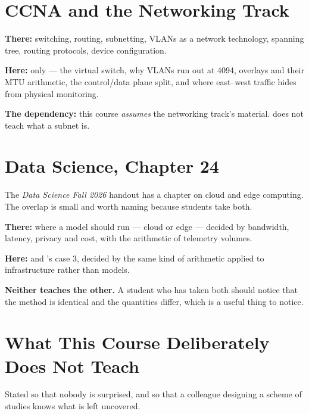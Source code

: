 \section{CCNA and the Networking Track}

\begin{tight}
  \item \textbf{There:} switching, routing, subnetting, VLANs as a network
        technology, spanning tree, routing protocols, device configuration.
  \item \textbf{Here:}  only --- the virtual switch, why VLANs
        run out at 4094, overlays and their MTU arithmetic, the control/data
        plane split, and where east--west traffic hides from physical
        monitoring.
  \item \textbf{The dependency:} this course \emph{assumes} the networking
        track's material.  does not teach what a subnet is.
\end{tight}

\section{Data Science, Chapter 24}

The \emph{Data Science Fall 2026} handout has a chapter on cloud and edge
computing. The overlap is small and worth naming because students take both.

\begin{tight}
  \item \textbf{There:} where a model should run --- cloud or edge --- decided
        by bandwidth, latency, privacy and cost, with the arithmetic of
        telemetry volumes.
  \item \textbf{Here:}  and 's case 3, decided
        by the same kind of arithmetic applied to infrastructure rather than
        models.
  \item \textbf{Neither teaches the other.} A student who has taken both should
        notice that the method is identical and the quantities differ, which is
        a useful thing to notice.
\end{tight}

\section{What This Course Deliberately Does Not Teach}

Stated so that nobody is surprised, and so that a colleague designing a scheme
of studies knows what is left uncovered.

